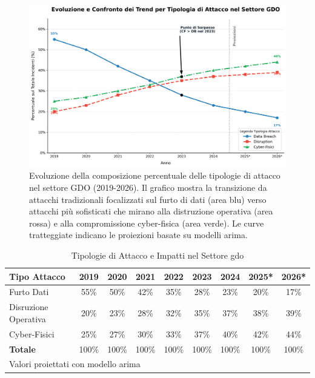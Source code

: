 \begin{figure}[htbp]
\centering
\includegraphics[width=\textwidth]{thesis_figures/cap1/evoluzione_attacchi.png}
\caption[Evoluzione della composizione percentuale delle tipologie di attacco nel settore GDO (2019-2026)]{Evoluzione della composizione percentuale delle tipologie di attacco nel settore GDO (2019-2026). Il grafico mostra la transizione da attacchi tradizionali focalizzati sul furto di dati (area blu) verso attacchi più sofisticati che mirano alla distruzione operativa (area rossa) e alla compromissione cyber-fisica (area verde). Le curve tratteggiate indicano le proiezioni basate su modelli \gls{arima}.}
\label{fig:evoluzione_attacchi}
\end{figure}

\begin{table}[htbp]
\centering
\small
\caption{Tipologie di Attacco e Impatti nel Settore \gls{gdo}}
\label{tab:threat_evolution}
\begin{tabular}{lcccccccc}
\toprule
\textbf{Tipo Attacco} & \textbf{2019} & \textbf{2020} & \textbf{2021} & \textbf{2022} & \textbf{2023} & \textbf{2024} & \textbf{2025*} & \textbf{2026*}\\
\midrule
Furto Dati & 55\% & 50\% & 42\% & 35\% & 28\% & 23\% & 20\% & 17\% \\
Disruzione Operativa & 20\% & 23\% & 28\% & 32\% & 35\% & 37\% & 38\% & 39\% \\
Cyber-Fisici & 25\% & 27\% & 30\% & 33\% & 37\% & 40\% & 42\% & 44\% \\
\midrule
\textbf{Totale} & 100\% & 100\% & 100\% & 100\% & 100\% & 100\% & 100\% & 100\% \\
\bottomrule
\multicolumn{9}{l}{\footnotesize * Valori proiettati con modello \gls{arima}}
\end{tabular}
\end{table}

